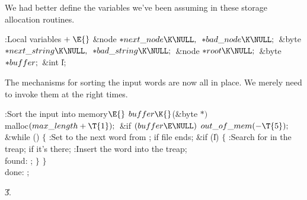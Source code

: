 We had better define the variables we've been assuming in these
storage allocation routines.

\Y\B\4:Local variables\X${}\mathrel+\E{}$\6
\&{node} ${}{*}\\{next\_node}\K\NULL,{}$ ${}{*}\\{bad\_node}\K\NULL;{}$\6
\&{byte} ${}{*}\\{next\_string}\K\NULL,{}$ ${}{*}\\{bad\_string}\K\NULL;{}$\6
\&{node} ${}{*}\\{root}\K\NULL;{}$\6
\&{byte} ${}{*}\\{buffer};{}$\6
\&{int} \|l;\par
\fi

The mechanisms for sorting the input words are now all in place.
We merely need to invoke them at the right times.

\Y\B\4:Sort the input into memory\X${}\E{}$\6
$\\{buffer}\K{}$(\&{byte} ${}{*}){}$ \\{malloc}${}(\\{max\_length}+\T{1});{}$\6
\&{if} ${}(\\{buffer}\E\NULL){}$\1\5
${}\\{out\_of\_mem}({-}\T{5});{}$\2\6
\&{while} ()\5
${}\{{}$\1\6
:Set  to the next word from ;  if file ends\X;\6
\&{if} (\|l)\5
${}\{{}$\1\6
:Search for  in the treap;  if it's
there\X;\6
:Insert the  word into the treap\X;\6
\4\\{found}:\5
;\6
\4${}\}{}$\2\6
\4${}\}{}$\2\6
\4\\{done}:\5
;\par
\U3.\fi

